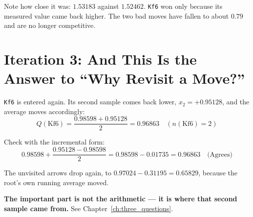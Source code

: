 Note how close it was: $1.53183$ against $1.52462$. \texttt{Kf6} won only because its measured value came back higher. The two bad moves have fallen to about $0.79$ and are no longer competitive.

\section{Iteration 3: And This Is the Answer to ``Why Revisit a Move?''}

\texttt{Kf6} is entered again. Its second sample comes back lower, $x_2 = +0.95128$, and the average moves accordingly:
\begin{equation}
  Q(\text{Kf6}) = \frac{0.98598 + 0.95128}{2} = \mathbf{0.96863} \quad (n(\text{Kf6}) = 2)
\end{equation}

Check with the incremental form:
\begin{equation*}
  0.98598 + \frac{0.95128 - 0.98598}{2} = 0.98598 - 0.01735 = \mathbf{0.96863} \quad \text{(Agrees)}
\end{equation*}

The unvisited arrows drop again, to $0.97024 - 0.31195 = 0.65829$, because the root's own running average moved.

\begin{center}
\begin{minipage}{\linewidth}
\centering

\label{fig:iter3}
\end{minipage}
\end{center}

\textbf{The important part is not the arithmetic --- it is where that second sample came from.} See Chapter~\ref{ch:three_questions}.
